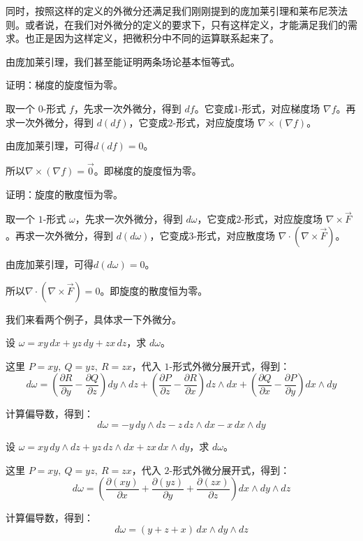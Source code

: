 同时，按照这样的定义的外微分还满足我们刚刚提到的庞加莱引理和莱布尼茨法则。或者说，在我们对外微分的定义的要求下，只有这样定义，才能满足我们的需求。也正是因为这样定义，把微积分中不同的运算联系起来了。

由庞加莱引理，我们甚至能证明两条场论基本恒等式。

\begin{myexample}
  证明：梯度的旋度恒为零。

  取一个 \(0\)-形式 \(f\)，先求一次外微分，得到 \(df\)。它变成\(1\)-形式，对应梯度场 \(\nabla f\)。再求一次外微分，得到 \(d(df)\)，它变成\(2\)-形式，对应旋度场 \(\nabla\times(\nabla f)\)。

由庞加莱引理，可得\(d(df)=0\)。

所以\(\nabla\times(\nabla f)=\vec{0}\)。即梯度的旋度恒为零。
\end{myexample}

\begin{myexample}
  证明：旋度的散度恒为零。

  取一个 \(1\)-形式 \(\omega\)，先求一次外微分，得到 \(d\omega\)，它变成\(2\)-形式，对应旋度场 \(\nabla\times\vec{F}\)。再求一次外微分，得到 \(d(d\omega)\)，它变成\(3\)-形式，对应散度场 \(\nabla\cdot(\nabla\times\vec{F})\)。

  由庞加莱引理，可得\(d(d\omega)=0\)。

所以\(\nabla\cdot(\nabla\times\vec{F})=0\)。即旋度的散度恒为零。
\end{myexample}

我们来看两个例子，具体求一下外微分。

\begin{myexample}
设 \(\omega=xy\,dx+yz\,dy+zx\,dz\)，求 \(d\omega\)。

这里 \(P=xy,\ Q=yz,\ R=zx\)，代入 \(1\)-形式外微分展开式，得到：
\[
d\omega=\left(\frac{\partial R}{\partial y}-\frac{\partial Q}{\partial z}\right)dy\wedge dz
+\left(\frac{\partial P}{\partial z}-\frac{\partial R}{\partial x}\right)dz\wedge dx
+\left(\frac{\partial Q}{\partial x}-\frac{\partial P}{\partial y}\right)dx\wedge dy
\]

计算偏导数，得到：
\[
d\omega=-y\,dy\wedge dz-z\,dz\wedge dx-x\,dx\wedge dy
\]
\end{myexample}

\begin{myexample}
设 \(\omega=xy\,dy\wedge dz+yz\,dz\wedge dx+zx\,dx\wedge dy\)，求 \(d\omega\)。

这里 \(P=xy,\ Q=yz,\ R=zx\)，代入 \(2\)-形式外微分展开式，得到：
\[
d\omega=\left(\frac{\partial (xy)}{\partial x}
+\frac{\partial (yz)}{\partial y}
+\frac{\partial (zx)}{\partial z}\right)dx\wedge dy\wedge dz
\]

计算偏导数，得到：
\[
d\omega=(y+z+x)\,dx\wedge dy\wedge dz
\]
\end{myexample}

